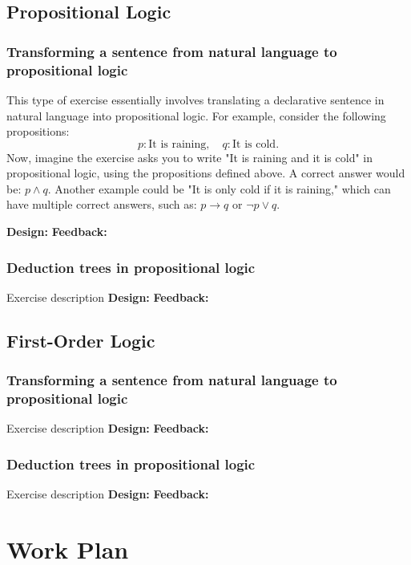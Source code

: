 \subsection{Propositional Logic}

\subsubsection{Transforming a sentence from natural language to propositional logic}
This type of exercise essentially involves translating a declarative sentence in natural language into propositional logic. For example, consider the following propositions:
\[
p: \text{It is raining}, \quad q: \text{It is cold}.
\]
Now, imagine the exercise asks you to write "It is raining and it is cold" in propositional logic, using the propositions defined above. A correct answer would be: \(p \land q\). Another example could be "It is only cold if it is raining," which can have multiple correct answers, such as: \(p \rightarrow q\) or \(\neg p \lor q\).




\textbf{Design: }
\textbf{Feedback: }

\subsubsection{Deduction trees in propositional logic}
Exercise description
\textbf{Design: }
\textbf{Feedback: }

\subsection{First-Order Logic}

\subsubsection{Transforming a sentence from natural language to propositional logic}
Exercise description
\textbf{Design: }
\textbf{Feedback: }

\subsubsection{Deduction trees in propositional logic}
Exercise description
\textbf{Design: }
\textbf{Feedback: }

\section{Work Plan}
